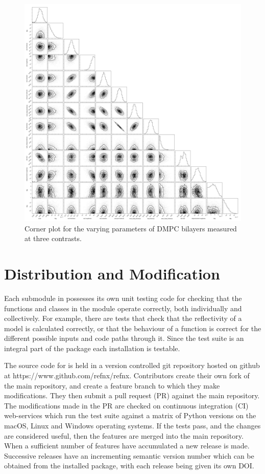 \documentclass[12pt]{article}
\begin{document}
\begin{figure}
  \includegraphics[width=\linewidth]{./datasets/corner}
  \caption{Corner plot for the varying parameters of DMPC bilayers measured at three contrasts.}
  \label{fig:corner}
\end{figure}

 
\section*{Distribution and Modification}
Each submodule in  possesses its own unit testing code for checking that the functions and classes in the module operate correctly, both individually and collectively. For example, there are tests that check that the reflectivity of a model is calculated correctly, or that the behaviour of a function is correct for the different possible inputs and code paths through it. Since the test suite is an integral part of the package each installation is testable.
 
 The source code for  is held in a version controlled git repository hosted on github at https://www.github.com/refnx/refnx. Contributors create their own fork of the main  repository, and create a feature branch to which they make modifications. They then submit a pull request (PR) against the main repository. The modifications made in the PR are checked on continuous integration (CI) web-services which run the test suite against a matrix of Python versions on the macOS, Linux and Windows operating systems. If the tests pass, and the changes are considered useful, then the features are merged into the main repository. When a sufficient number of features have accumulated a new release is made. Successive releases have an incrementing semantic version number which can be obtained from the installed package, with each release being given its own DOI.
\end{document}
